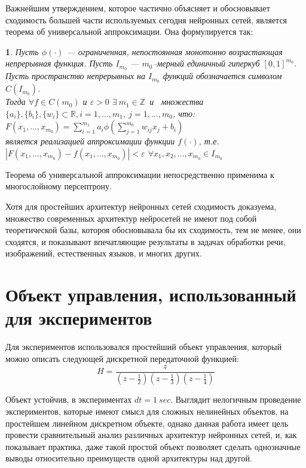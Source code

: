 \documentclass[12pt, oneside]{extbook}
\newtheorem{theorem}{\protect\thmname}
\newcommand{\thmname}{}\newcommand{\exaname}{} %
\renewcommand{\thmname}{Теорема}
\begin{document}
\begin{flushleft}
\par
Важнейшим утверждением, которое частично объясняет и обосновывает сходимость большей части используемых сегодня нейронных сетей, является теорема об универсальной аппроксимации. Она формулируется так:\\
\begin{theorem}
\label{universal_approximation}
Пусть $\phi(\cdot)$ --- ограниченная, непостоянная монотонно возрастающая непрерывная функция. Пусть $I_{m_0}$ --- $m_0$--мерный единичный гиперкуб $[0, 1]^{m_0}$. Пусть пространство непрерывных на $I_{m_0}$ функций обозначается символом $C(I_{m_0})$.\\ Тогда $\forall f \in C(m_0)$ и $\varepsilon > 0$ $\exists\ m_1 \in \mathbb{Z}$~и~ множества~ $\{a_i\}, \{b_i\}, \{w_i\} \subset \mathbb{R}, i=1,...,m_1,\  j=1,...,m_0$, что:\\ $F\left(x_{1}, \ldots, x_{m_{0}}\right)=\sum_{i=1}^{m_{1}} a_{i} \phi\left(\sum_{j=1}^{m_{0}} w_{i j} x_{j}+b_{i}\right)$\\
является реализацией аппроксимации функции $f(\cdot)$, т.е.
$\left|F\left(x_{1}, \ldots, x_{m_{0}}\right)-f\left(x_{1}, \ldots, x_{m_{0}}\right)\right|<\varepsilon$
$\forall x_1,x_2,...,x_{m_0} \in I_{m_0}$\\
\end{theorem}
Теорема об универсальной аппроксимации непосредственно применима к многослойному персептрону. 
\par 
Хотя для простейших архитектур нейронных сетей сходимость доказуема, множество современных архитектур нейросетей не имеют под собой теоретической базы, котороя обосновывала бы их сходимость, тем не менее, они сходятся, и показывают впечатляющие результаты в задачах обработки речи, изображений, естественных языков, и многих других.\\
\section{Объект управления, использованный для экспериментов}
Для экспериментов использовался простейший объект управления, который можно описать следующей дискретной передаточной функцией:\\
\begin{equation} \label{eq:1}
H = \frac{z}{(z-\frac{1}{2})(z-\frac{1}{3})(z-\frac{1}{4})}
\end{equation}
\par
Объект устойчив, в экспериментах $dt = 1~sec$. Выглядит нелогичным проведение экспериментов, которые имеют смысл для сложных нелинейных объектов, на простейшем линейном дискретном объекте, однако данная работа имеет цель провести сравнительный анализ различных архитектур нейронных сетей, и, как показывает практика, даже такой простой объект позволяет сделать однозначные выводы относительно преимуществ одной архитектуры над другой.

\end{flushleft}
\end{document}
